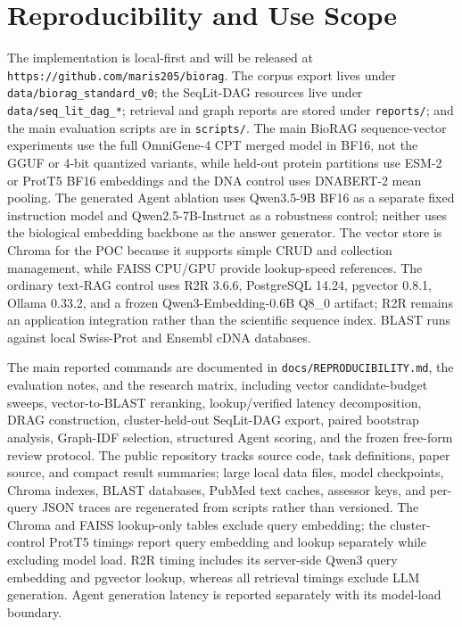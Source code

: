 \documentclass[11pt]{article}
\begin{document}
\section{Reproducibility and Use Scope}

The implementation is local-first and will be released at \texttt{https://github.com/maris205/biorag}. The corpus export lives under \texttt{data/biorag\_standard\_v0}; the SeqLit-DAG resources live under \texttt{data/seq\_lit\_dag\_*}; retrieval and graph reports are stored under \texttt{reports/}; and the main evaluation scripts are in \texttt{scripts/}. The main BioRAG sequence-vector experiments use the full OmniGene-4 CPT merged model in BF16, not the GGUF or 4-bit quantized variants, while held-out protein partitions use ESM-2 or ProtT5 BF16 embeddings and the DNA control uses DNABERT-2 mean pooling. The generated Agent ablation uses Qwen3.5-9B BF16 as a separate fixed instruction model and Qwen2.5-7B-Instruct as a robustness control; neither uses the biological embedding backbone as the answer generator. The vector store is Chroma for the POC because it supports simple CRUD and collection management, while FAISS CPU/GPU provide lookup-speed references. The ordinary text-RAG control uses R2R 3.6.6, PostgreSQL 14.24, pgvector 0.8.1, Ollama 0.33.2, and a frozen Qwen3-Embedding-0.6B Q8\_0 artifact; R2R remains an application integration rather than the scientific sequence index. BLAST runs against local Swiss-Prot and Ensembl cDNA databases.

The main reported commands are documented in \texttt{docs/REPRODUCIBILITY.md}, the evaluation notes, and the research matrix, including vector candidate-budget sweeps, vector-to-BLAST reranking, lookup/verified latency decomposition, DRAG construction, cluster-held-out SeqLit-DAG export, paired bootstrap analysis, Graph-IDF selection, structured Agent scoring, and the frozen free-form review protocol. The public repository tracks source code, task definitions, paper source, and compact result summaries; large local data files, model checkpoints, Chroma indexes, BLAST databases, PubMed text caches, assessor keys, and per-query JSON traces are regenerated from scripts rather than versioned. The Chroma and FAISS lookup-only tables exclude query embedding; the cluster-control ProtT5 timings report query embedding and lookup separately while excluding model load. R2R timing includes its server-side Qwen3 query embedding and pgvector lookup, whereas all retrieval timings exclude LLM generation. Agent generation latency is reported separately with its model-load boundary.
\end{document}
